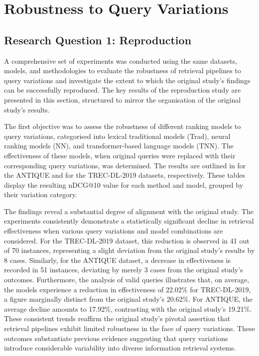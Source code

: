\section{Robustness to Query Variations}
\subsection{Research Question 1: Reproduction}
A comprehensive set of experiments was conducted using the same datasets, models, and methodologies to evaluate the robustness of retrieval pipelines to query variations and investigate the extent to which the original study's findings can be successfully reproduced. The key results of the reproduction study are presented in this section, structured to mirror the organisation of the original study's results.

The first objective was to assess the robustness of different ranking models to query variations, categorised into lexical traditional models (Trad), neural ranking models (NN), and transformer-based language models (TNN). The effectiveness of these models, when original queries were replaced with their corresponding query variations, was determined. The results are outlined in  for the ANTIQUE and  for the TREC-DL-2019 datasets, respectively. These tables display the resulting nDCG@10 value for each method and model, grouped by their variation category.




The findings reveal a substantial degree of alignment with the original study. The experiments consistently demonstrate a statistically significant decline in retrieval effectiveness when various query variations and model combinations are considered. For the TREC-DL-2019 dataset, this reduction is observed in 41 out of 70 instances, representing a slight deviation from the original study's results by 8 cases. Similarly, for the ANTIQUE dataset, a decrease in effectiveness is recorded in 51 instances, deviating by merely 3 cases from the original study's outcomes. Furthermore, the analysis of valid queries illustrates that, on average, the models experience a reduction in effectiveness of 22.02\% for TREC-DL-2019, a figure marginally distinct from the original study's 20.62\%. For ANTIQUE, the average decline amounts to 17.92\%, contrasting with the original study's 19.21\%. These consistent trends reaffirm the original study's pivotal assertion that retrieval pipelines exhibit limited robustness in the face of query variations. These outcomes substantiate previous evidence suggesting that query variations introduce considerable variability into diverse information retrieval systems.

